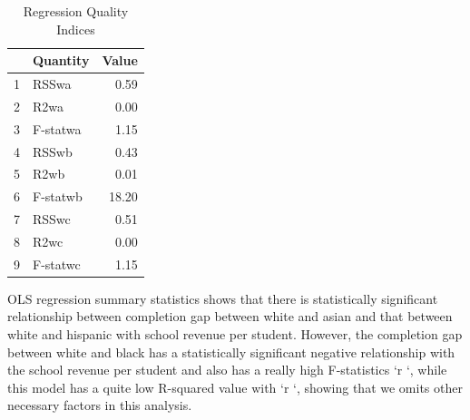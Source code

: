 \documentclass{article}
\begin{document}
\begin{table}[ht]
\centering
\caption{Regression Quality Indices} 
\begin{tabular}{rlr}
  \hline
 & Quantity & Value \\ 
  \hline
1 & RSSwa & 0.59 \\ 
  2 & R2wa & 0.00 \\ 
  3 & F-statwa & 1.15 \\ 
  4 & RSSwb & 0.43 \\ 
  5 & R2wb & 0.01 \\ 
  6 & F-statwb & 18.20 \\ 
  7 & RSSwc & 0.51 \\ 
  8 & R2wc & 0.00 \\ 
  9 & F-statwc & 1.15 \\ 
   \hline
\end{tabular}
\end{table}
OLS regression summary statistics shows that there is statistically significant relationship between completion gap between white and asian and that between white and hispanic with school revenue per student. However, the completion gap between white and black has a statistically significant negative relationship with the school revenue per student and also has a really high F-statistics `r   `, while this model has a quite low R-squared value with `r `,  showing that we omits other necessary factors in this analysis. 
\end{document}
